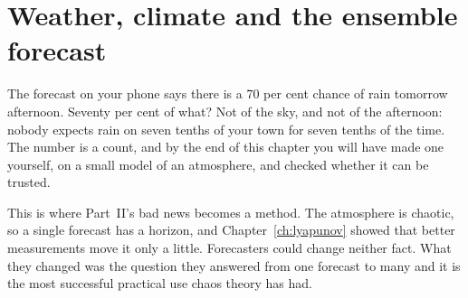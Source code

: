 
\chapter{Weather, climate and the ensemble forecast}
\label{ch:weather}

\noindent
The forecast on your phone says there is a $70$ per cent chance of rain
tomorrow afternoon. Seventy per cent of what? Not of the sky, and not of the
afternoon: nobody expects rain on seven tenths of your town for seven tenths
of the time. The number is a count, and by the end of this chapter you will
have made one yourself, on a small model of an atmosphere, and checked
whether it can be trusted.

This is where Part~II's bad news becomes a method. The atmosphere is
chaotic, so a single forecast has a horizon, and Chapter~\ref{ch:lyapunov}
showed that better measurements move it only a little. Forecasters could
change neither fact. What they changed was the question they answered
\dash{} from one forecast to many \dash{} and it is the most successful
practical use chaos theory has had.

\begin{outcomes}
\end{outcomes}

